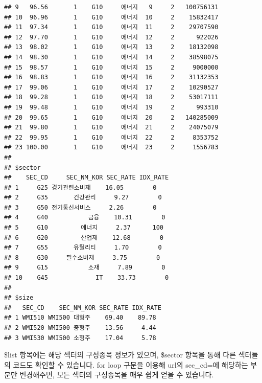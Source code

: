 \documentclass[]{book}
\begin{document}
\begin{verbatim}
## 9   96.56       1    G10     에너지   9     2   100756131
## 10  96.96       1    G10     에너지  10     2    15832417
## 11  97.34       1    G10     에너지  11     2    29707590
## 12  97.70       1    G10     에너지  12     2      922026
## 13  98.02       1    G10     에너지  13     2    18132098
## 14  98.30       1    G10     에너지  14     2    38598075
## 15  98.57       1    G10     에너지  15     2     9000000
## 16  98.83       1    G10     에너지  16     2    31132353
## 17  99.06       1    G10     에너지  17     2    10290527
## 18  99.28       1    G10     에너지  18     2    53017111
## 19  99.48       1    G10     에너지  19     2      993310
## 20  99.65       1    G10     에너지  20     2   140285009
## 21  99.80       1    G10     에너지  21     2    24075079
## 22  99.95       1    G10     에너지  22     2     8353752
## 23 100.00       1    G10     에너지  23     2     1556783
## 
## $sector
##    SEC_CD     SEC_NM_KOR SEC_RATE IDX_RATE
## 1     G25 경기관련소비재    16.05        0
## 2     G35       건강관리     9.27        0
## 3     G50 전기통신서비스     2.26        0
## 4     G40           금융    10.31        0
## 5     G10         에너지     2.37      100
## 6     G20         산업재    12.68        0
## 7     G55       유틸리티     1.70        0
## 8     G30     필수소비재     3.75        0
## 9     G15           소재     7.89        0
## 10    G45             IT    33.73        0
## 
## $size
##   SEC_CD    SEC_NM_KOR SEC_RATE IDX_RATE
## 1 WMI510 WMI500 대형주    69.40    89.78
## 2 WMI520 WMI500 중형주    13.56     4.44
## 3 WMI530 WMI500 소형주    17.04     5.78
\end{verbatim}

\$list 항목에는 해당 섹터의 구성종목 정보가 있으며, \$sector 항목을 통해 다른 섹터들의 코드도 확인할 수 있습니다. for loop 구문을 이용해 url의 sec\_cd=에 해당하는 부분만 변경해주면, 모든 섹터의 구성종목을 매우 쉽게 얻을 수 있습니다.
\end{document}
